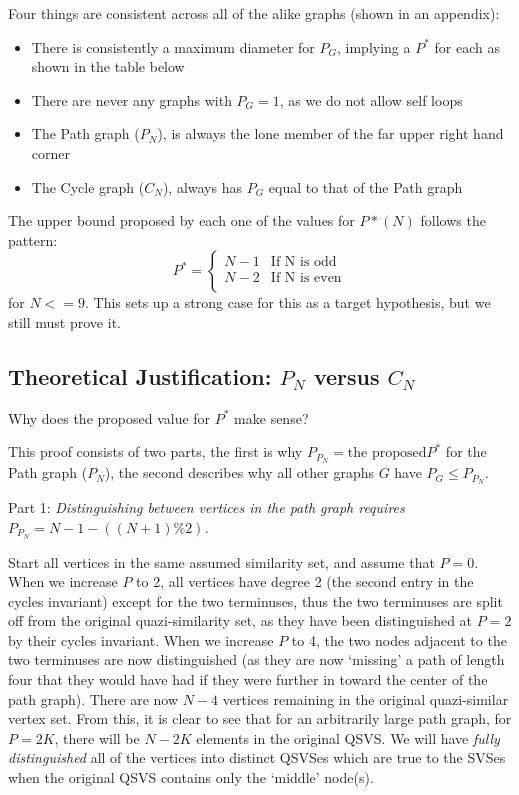 Four things are consistent across all of the alike graphs (shown in an appendix):
\begin{itemize}
\item{There is consistently a maximum diameter for $P_G$, implying a $P^*$ for each as shown in the table below}
\item{There are never any graphs with $P_G = 1$, as we do not allow self loops }
\item{The Path graph ($P_N$), is always the lone member of the far upper right hand corner}
\item{The Cycle graph ($C_N$), always has $P_G$ equal to that of the Path graph}
\end{itemize}
The upper bound proposed by each one of the values for $P*(N)$ follows the pattern:
\[ P^* = \begin{cases} 
      N-1 & \text{If N is odd} \\
      N-2 & \text{If N is even} \\
   \end{cases}
\]
for $N <=9$. This sets up a strong case for this as a target hypothesis, but we still must prove it.

\subsection{Theoretical Justification: $P_N$ versus $C_N$}
Why does the proposed value for $P^*$ make sense?

This proof consists of two parts, the first is why $P_{P_N} = \text{the proposed} P^*$ for the Path graph ($P_N$), the second describes why all other graphs $G$ have $P_G \leq P_{P_N}$.

Part 1: \emph{Distinguishing between vertices in the path graph requires $P_{P_N} = N - 1 - ((N+1)\%2)$.}

Start all vertices in the same assumed similarity set, and assume that $P = 0$.
When we increase $P$ to 2, all vertices have degree 2 (the second entry in the cycles invariant) except for the two terminuses, thus the two terminuses are split off from the original quazi-similarity set, as they have been distinguished at $P=2$ by their cycles invariant.
When we increase $P$ to 4, the two nodes adjacent to the two terminuses are now distinguished (as they are now `missing' a path of length four that they would have had if they were further in toward the center of the path graph). 
There are now $N-4$ vertices remaining in the original quazi-similar vertex set.
From this, it is clear to see that for an arbitrarily large path graph, for $P=2K$, there will be $N-2K$ elements in the original QSVS.
We will have \emph{fully distinguished} all of the vertices into distinct QSVSes which are true to the SVSes when the original QSVS contains only the `middle' node(s).

